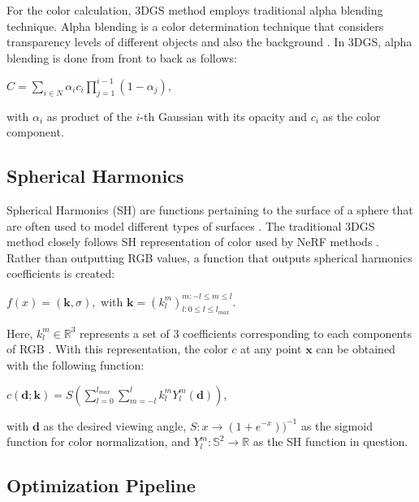 For the color calculation, 3DGS method employs traditional alpha blending technique. Alpha blending is a color determination technique that considers transparency levels of different objects and also the background \parencite{alphablending}. In 3DGS, alpha blending is done from front to back as follows:

\begin{center}
    \(C = \sum\limits_{i \in N} \alpha_i c_i \prod\limits_{j = 1}^{i - 1} (1 - \alpha_j),\)
\end{center}
with \(\alpha_i\) as product of the \(i\)-th Gaussian with its opacity and \(c_i\) as the color component.

\subsection{Spherical Harmonics}

Spherical Harmonics (SH) are functions pertaining to the surface of a sphere that are often used to model different types of surfaces \parencite{sh-ex-01} \parencite{sh-ex-02}. The traditional 3DGS method closely follows SH representation of color used by NeRF methods \parencite{plenoctrees}. Rather than outputting RGB values, a function that outputs spherical harmonics coefficients is created:

\begin{center}
    \(f(x) = (\mathbf{k}, \sigma),\) with \(
    \mathbf{k} = (k^m_l)^{m:-l \leq m \leq l}_{l: 0 \leq l \leq l_{max}}.
    \)
\end{center}
Here, \(k^m_l \in \mathbb{R}^3\) represents a set of 3 coefficients corresponding to each components of RGB \parencite{plenoctrees}. With this representation, the color \(c\) at any point \(\mathbf{x}\) can be obtained with the following function:

\begin{center}
    \(c(\mathbf{d; k}) = S (\sum\limits_{l = 0}^{l_{max}} \sum\limits_{m = -l}^{l} k^m_l Y^m_l (\mathbf{d}))\),
\end{center}
with \(\mathbf{d}\) as the desired viewing angle, \(S : x \rightarrow (1 + e^{-x}))^{-1}\) as the sigmoid function for color normalization, and \(Y^m_l: \mathbb{S}^2 \rightarrow \mathbb{R}\) as the SH function in question.

\subsection{Optimization Pipeline}


